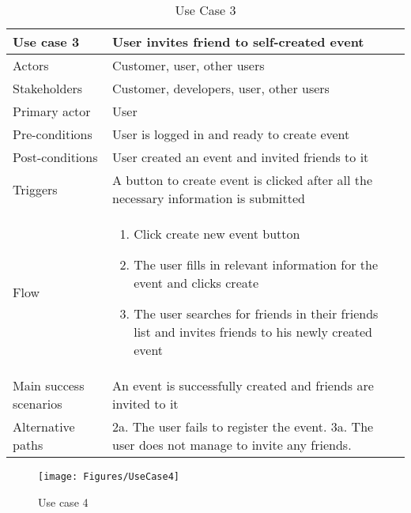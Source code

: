 \begin{table}[H]
\begin{tabular}{ | L{0.25\linewidth} | L{0.75\linewidth} | } 
 \hline {}
 Use case 3 & User invites friend to self-created event  \\ 
 \hline
 Actors & Customer, user, other users \\ 
 \hline
 Stakeholders & Customer, developers, user, other users \\ 
  \hline
 Primary actor & User  \\ 
 \hline
 Pre-conditions & User is logged in and ready to create event \\ 
 \hline
 Post-conditions & User created an event and invited friends to it \\ 
  \hline
 Triggers & A button to create event is clicked after all the necessary information is submitted  \\ 
 \hline
Flow & 
    \vspace{-5mm}
    \begin{enumerate}[noitemsep]
  \item Click create new event button
  \item The user fills in relevant information for the event and clicks create
  \item The user searches for friends in their friends list and invites friends to his newly created event
   \end{enumerate}\\ 
 \hline
 Main success scenarios & An event is successfully created and friends are invited to it \\ 
 \hline
 Alternative paths & 2a. The user fails to register the event.
3a. The user does not manage to invite any friends.\\
 \hline
\end{tabular}
\caption{Use Case 3}
\end{table}

\begin{figure}[H]
\centering
\texttt{[image: Figures/UseCase4]}
\caption{Use case 4}
    \label{fig:UC4}
    \end{figure}

